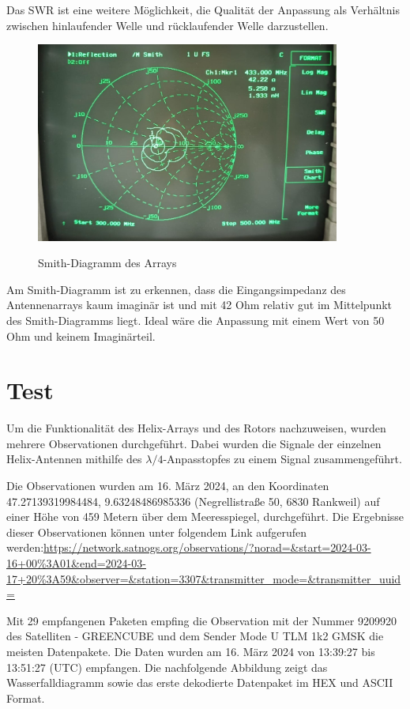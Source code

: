 Das SWR ist eine weitere Möglichkeit, die Qualität der Anpassung als Verhältnis zwischen hinlaufender Welle und rücklaufender Welle darzustellen.

\begin{figure}[H]
	\centering
	\includegraphics[width=10cm]{../ref/Array-Smith.jpg}
	\label{fig:array-Smith}
	\caption{Smith-Diagramm des Arrays}
\end{figure}

Am Smith-Diagramm ist zu erkennen, dass die Eingangsimpedanz des Antennenarrays kaum imaginär ist und mit 42 Ohm relativ gut im Mittelpunkt des Smith-Diagramms liegt. Ideal wäre die Anpassung mit einem Wert von 50 Ohm und keinem Imaginärteil.
\newpage
\SecAuth{\emplLastA}
\section{Test}
Um die Funktionalität des Helix-Arrays und des Rotors nachzuweisen, wurden mehrere Observationen durchgeführt. Dabei wurden die Signale der einzelnen Helix-Antennen mithilfe des $\lambda/4$-Anpasstopfes zu einem Signal zusammengeführt.

Die Observationen wurden am 16. März 2024, an den Koordinaten 47.27139319984484, 9.63248486985336 (Negrellistraße 50, 6830 Rankweil) auf einer Höhe von 459 Metern über dem Meeresspiegel, durchgeführt. Die Ergebnisse dieser Observationen können unter folgendem Link aufgerufen werden:\newline \url{https://network.satnogs.org/observations/?norad=&start=2024-03-16+00\%3A01\&end=2024-03-17+20\%3A59\&observer=\&station=3307\&transmitter_mode=\&transmitter_uuid=}

Mit 29 empfangenen Paketen empfing die Observation mit der Nummer 9209920 des Satelliten  - GREENCUBE\grqq{}  und dem Sender \glqq Mode U TLM 1k2 GMSK\grqq{} die meisten Datenpakete. Die Daten wurden am 16. März 2024 von 13:39:27 bis 13:51:27 (UTC) empfangen. Die nachfolgende Abbildung zeigt das Wasserfalldiagramm sowie das erste dekodierte Datenpaket im HEX und ASCII Format.

